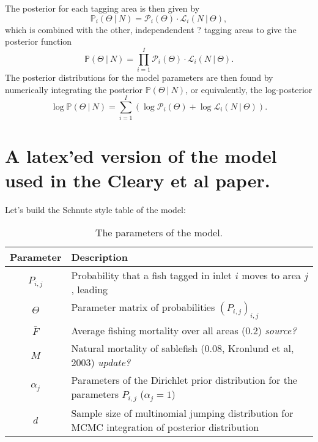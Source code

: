 \documentclass[12pt]{article}
\newcommand{\sj}[1]{{\color{red}\mbox{}\marginpar{\raggedleft\hspace{0pt}*} #1}}
\newcommand{\cL}{\mathcal{L}}
\newcommand{\PP}{\mathbb{P}}
\newcommand{\cP}{\mathcal{P}}
\begin{document}
The posterior for each tagging area is then given by
\begin{equation}
\PP_i(\Theta ~|~ N) = \cP_i(\Theta) \cdot \cL_i(N~|~\Theta),
\end{equation}
which is combined with the other, independendent \sj{?} tagging areas to give the posterior function
\begin{equation}
  \PP(\Theta ~|~ N) = \prod_{i = 1}^I \cP_i(\Theta) \cdot \cL_i(N~|~\Theta).
\end{equation}
The posterior distributions for the model parameters are then found by numerically integrating the posterior $\PP(\Theta ~|~ N)$, or equivalently, the log-posterior
\begin{equation}
\log \PP(\Theta ~|~ N) = \sum_{i = 1}^I \left( \log\cP_i(\Theta) + \log \cL_i(N~|~\Theta) \right).
\end{equation}

\section{A latex'ed version of the model used in the Cleary et al paper.}

Let's build the Schnute style table of the model:

\begin{table}[!h]
\begin{center}
\begin{tabular}{c | l}

\hline
Parameter & Description \\
\hline
$P_{i,j}$ & Probability that a fish tagged in inlet $i$ moves to area $j$, leading \\
$\Theta$ & Parameter matrix of probabilities $(P_{i,j})_{i,j}$ \\
$\bar{F}$ & Average fishing mortality over all areas (0.2) {\color{red}\it source?} \\
$M$ & Natural mortality of sablefish (0.08, Kronlund et al, 2003) {\color{red}\it update?} \\
$\alpha_j$ & Parameters of the Dirichlet prior distribution for the parameters $P_{i,j}$ ($\alpha_j = 1$) \\
$d$ & Sample size of multinomial jumping distribution for MCMC integration of posterior distribution \\
\hline
\end{tabular}
\caption{The parameters of the model.}\label{tab:parameters}
\end{center}
\end{table}
\end{document}
